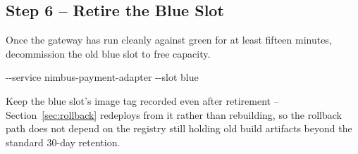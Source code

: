 \subsection{Step 6 -- Retire the Blue Slot}
Once the gateway has run cleanly against green for at least fifteen minutes, decommission the
old blue slot to free capacity.

\begin{cmdbox}
\hspace*{1.4em}-{}-service nimbus-payment-adapter -{}-slot blue
\end{cmdbox}

\begin{infobox}[Note]
Keep the blue slot's image tag recorded even after retirement -- Section~\ref{sec:rollback}
redeploys from it rather than rebuilding, so the rollback path does not depend on the registry
still holding old build artifacts beyond the standard 30-day retention.
\end{infobox}
